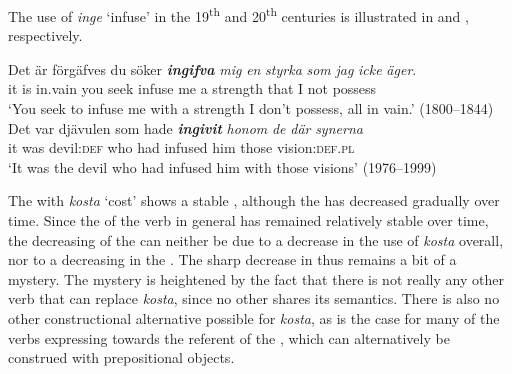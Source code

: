 \documentclass[output=paper]{langscibook}
\begin{document}
\begin{table}
\caption{Frequency measures of the verb-specific DOC with \textit{inge} ‘infuse’}
\label{tab:valdeson:16}
\end{table}

The use of \textit{inge} ‘infuse’ in the 19\textsuperscript{th} and 20\textsuperscript{th} centuries is illustrated in  and , respectively.


\ea \label{ex:valdeson:24}
\gll Det   är förgäfves du   söker \textbf{\textit{ingifva}} \textit{mig} \textit{en} \textit{styrka} \textit{som} \textit{jag} \textit{icke} \textit{äger}.\\
  it       is    in.vain     you   seek     infuse       me   a   strength that   I   not   possess\\
\glt `You seek to infuse me with a strength I don’t possess, all in vain.’ (1800–1844)
\ex \label{ex:valdeson:25}
\gll Det var djävulen     som   hade \textbf{\textit{ingivit}} \textit{honom} {\textit{de} \textit{där}} \textit{synerna}\\
  it     was devil:\textsc{def}   who     had     infused   him     those      vision:\textsc{def.pl}\\
\glt `It was the devil who had infused him with those visions’ (1976–1999)
\z


\label{sec:valdeson:5.3.3.4}
    
The  with \textit{kosta} ‘cost’ shows a stable , although the  has decreased gradually over time. Since the  of the verb in general has remained relatively stable over time, the decreasing  of the  can neither be due to a decrease in the use of \textit{kosta} overall, nor to a decreasing  in the . The sharp decrease in  thus remains a bit of a mystery. The mystery is heightened by the fact that there is not really any other verb that can replace \textit{kosta}, since no other  shares its semantics. There is also no other constructional alternative possible for \textit{kosta}, as is the case for many of the verbs expressing  towards the referent of the , which can alternatively be construed with prepositional objects.
\end{document}
